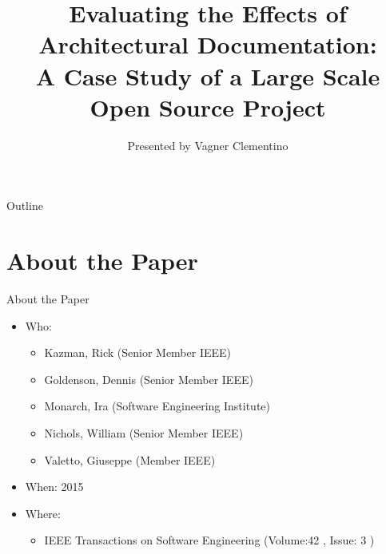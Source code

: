 \documentclass[t,14pt,mathserif]{beamer}
\title[] %
{Evaluating the Effects of Architectural Documentation:\\
A Case Study of a Large Scale Open Source Project}
\subtitle
{Presented by Vagner Clementino}
\institute[] %
{
  Department of Computer Science\\
  Federal University of Minas Gerais (UFMG)\\
  Software Archicteture - 2016\\
  }
\date[2015/04/29] %
\begin{document}
\begin{frame}
  \titlepage
\end{frame}

\begin{frame}{Outline}
  \tableofcontents
\end{frame}




\section{About the Paper}

\begin{frame}{About the Paper}
	\begin{itemize}
		\item Who:
			\begin{itemize}				
				\item Kazman, Rick (Senior Member IEEE)
				\item Goldenson, Dennis (Senior Member IEEE)
				\item Monarch, Ira (Software Engineering Institute)
				\item Nichols, William (Senior Member IEEE)
				\item Valetto, Giuseppe	(Member IEEE)		
			\end{itemize}				
		\item When: 2015
		
			
	    \item Where:
	      
	       \begin{itemize}
		     
		     \item IEEE Transactions on Software Engineering  (Volume:42 ,  Issue: 3 )  
			        
	       \end{itemize}
		
	
	\end{itemize}


\end{frame}
\end{document}
